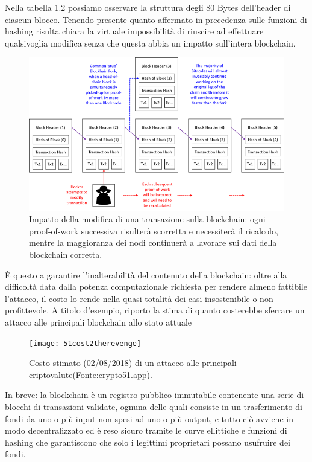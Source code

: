 Nella tabella 1.2 possiamo osservare la struttura degli 80 Bytes dell’header di ciascun blocco. Tenendo presente quanto affermato in precedenza sulle funzioni di hashing risulta chiara la virtuale impossibilità di riuscire ad effettuare qualsivoglia modifica senza che questa abbia un impatto sull’intera blockchain.

\begin{figure}
	\centering
	\includegraphics[width=1.0\linewidth]{images/blockchain-diagram}
	\caption{Impatto della modifica di una transazione sulla blockchain: ogni proof-of-work successiva risulterà scorretta e necessiterà il ricalcolo, mentre la maggioranza dei nodi continuerà a lavorare sui dati della blockchain corretta.}
	\label{fig:blockchain-diagram}
\end{figure}


È questo a garantire l’inalterabilità del contenuto della blockchain: oltre alla difficoltà data dalla potenza computazionale richiesta per rendere almeno fattibile l’attacco, il costo lo rende nella quasi totalità dei casi insostenibile o non profittevole.
A titolo d’esempio, riporto la stima di quanto costerebbe sferrare un attacco alle principali blockchain allo stato attuale

\begin{figure}[h]
\centering
\texttt{[image: 51cost2therevenge]}	
\caption{Costo stimato (02/08/2018) di un attacco alle principali criptovalute(Fonte:\url{crypto51.app}).}
\label{fig:51cost2therevenge}
\end{figure}



In breve: la blockchain è un registro pubblico immutabile contenente una serie di blocchi di transazioni validate, ognuna delle quali consiste in un trasferimento di fondi da uno o più input non spesi ad uno o più output, e tutto ciò avviene in modo decentralizzato ed è reso sicuro tramite le curve ellittiche e funzioni di hashing che garantiscono che solo i legittimi proprietari possano usufruire dei fondi.



